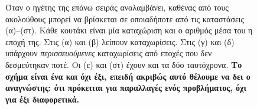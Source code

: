%
\begin{figure}[t]
\centering
{}
\caption[Έξι καταστάσεις που μπορεί να βρει ένας νέος ηγέτης]%
{Όταν ο ηγέτης της επάνω σειράς αναλαμβάνει, καθένας από τους ακολούθους
μπορεί να βρίσκεται σε οποιαδήποτε από τις καταστάσεις (α)–(στ). Κάθε
κουτάκι είναι μία καταχώριση και ο αριθμός μέσα του η εποχή της.
Στις (α) και (β) λείπουν καταχωρίσεις. Στις (γ) και (δ) υπάρχουν
\emph{περισσευούμενες} καταχωρίσεις από εποχές που δεν δεσμεύτηκαν ποτέ.
Οι (ε) και (στ) έχουν και τα δύο ταυτόχρονα. \textbf{Το σχήμα είναι ένα και
όχι έξι, επειδή ακριβώς αυτό θέλουμε να δει ο αναγνώστης: ότι πρόκειται για
παραλλαγές ενός προβλήματος, όχι για έξι διαφορετικά.}}
\label{fig:senaria}
\end{figure}
